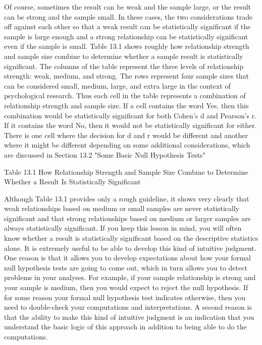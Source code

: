 Of course, sometimes the result can be weak and the sample large, or the result can be strong and the sample small. In these cases, the two considerations trade off against each other so that a weak result can be statistically significant if the sample is large enough and a strong relationship can be statistically significant even if the sample is small. Table 13.1 shows roughly how relationship strength and sample size combine to determine whether a sample result is statistically significant. The columns of the table represent the three levels of relationship strength: weak, medium, and strong. The rows represent four sample sizes that can be considered small, medium, large, and extra large in the context of psychological research. Thus each cell in the table represents a combination of relationship strength and sample size. If a cell contains the word Yes, then this combination would be statistically significant for both Cohen's d and Pearson's r. If it contains the word No, then it would not be statistically significant for either. There is one cell where the decision for d and r would be different and another where it might be different depending on some additional considerations, which are discussed in Section 13.2 "Some Basic Null Hypothesis Tests"




Table 13.1 How Relationship Strength and Sample Size Combine to Determine Whether a Result Is Statistically Significant      



Although Table 13.1 provides only a rough guideline, it shows very clearly that weak relationships based on medium or small samples are never statistically significant and that strong relationships based on medium or larger samples are always statistically significant. If you keep this lesson in mind, you will often know whether a result is statistically significant based on the descriptive statistics alone. It is extremely useful to be able to develop this kind of intuitive judgment. One reason is that it allows you to develop expectations about how your formal null hypothesis tests are going to come out, which in turn allows you to detect problems in your analyses. For example, if your sample relationship is strong and your sample is medium, then you would expect to reject the null hypothesis. If for some reason your formal null hypothesis test indicates otherwise, then you need to double-check your computations and interpretations. A second reason is that the ability to make this kind of intuitive judgment is an indication that you understand the basic logic of this approach in addition to being able to do the computations.


